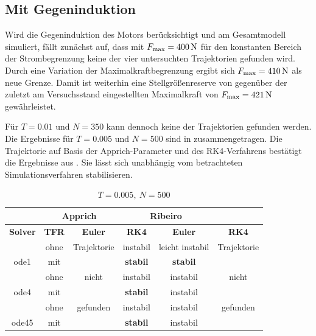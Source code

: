\subsection{Mit Gegeninduktion}\label{subsec:mitInd}

Wird die Gegeninduktion des Motors berücksichtigt und am Gesamtmodell simuliert, fällt zunächst auf, dass mit $F_{\mathrm{max}}= 400\,\mathrm{N}$ für den konstanten Bereich der Strombegrenzung keine der vier untersuchten Trajektorien gefunden wird. Durch eine Variation der Maximalkraftbegrenzung ergibt sich $F_{\mathrm{max}}= 410\,\mathrm{N}$ als neue Grenze. Damit ist weiterhin eine Stellgrößenreserve von  gegenüber der zuletzt am Versuchsstand eingestellten Maximalkraft von $F_{\mathrm{max}}= 421\,\mathrm{N}$ gewährleistet. 

Für $T=0.01$ und $N=350$ kann dennoch keine der Trajektorien gefunden werden. Die Ergebnisse für $T=0.005$ und $N=500$ sind in  zusammengetragen. Die Trajektorie auf Basis der Apprich-Parameter und des RK4-Verfahrens bestätigt die Ergebnisse aus . Sie lässt sich unabhängig vom betrachteten Simulationsverfahren stabilisieren.
\begin{table}[H]
	\centering
	\caption{$T=0.005, \ N=500$}
		\begin{tabular}{c|c|c|c|c|c}
			\rowcolor[gray]{0.9}
			\multicolumn{2}{c|}{\textbf{Simulation}} & \multicolumn{2}{c|}{\textbf{Apprich}} & \multicolumn{2}{c}{\textbf{Ribeiro}} \\
			\midrule
			\rowcolor[gray]{0.9}
			\textbf{Solver} & \textbf{TFR} & \textbf{Euler} & \textbf{RK4} & \textbf{Euler} & \textbf{RK4} \\
			\midrule
			\cellcolor[gray]{0.9}  											& \cellcolor[gray]{.9}ohne & Trajektorie  & instabil & leicht instabil & Trajektorie\\
			\multirow{-2}{*}{\cellcolor[gray]{.9}ode1}	& \cellcolor[gray]{.9}mit  &   						& \textbf{stabil} & \textbf{stabil} 				 & 	\\
			\midrule		
			\cellcolor[gray]{0.9}  											& \cellcolor[gray]{.9}ohne & nicht	& instabil 						& instabil & nicht\\
			\multirow{-2}{*}{\cellcolor[gray]{.9}ode4}	& \cellcolor[gray]{.9}mit  &        & \textbf{stabil}   	& instabil & \\
			\midrule	
			\cellcolor[gray]{0.9}  											& \cellcolor[gray]{.9}ohne & gefunden 	&  instabil    			& instabil 	& gefunden\\
			\multirow{-2}{*}{\cellcolor[gray]{.9}ode45}	& \cellcolor[gray]{.9}mit  &  					&  \textbf{stabil}  & instabil 	& \\																											
		\end{tabular}
	\label{tab:T001N350Fmax410}
\end{table}

